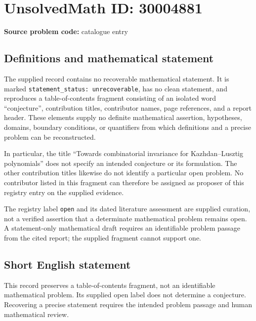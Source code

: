\documentclass[11pt]{article}
\begin{document}
\section*{UnsolvedMath ID: 30004881}
\textbf{Source problem code:} catalogue entry
\subsection{Definitions and mathematical statement}
The supplied record contains no recoverable mathematical statement. It is marked \texttt{statement\_status: unrecoverable}, has no clean statement, and reproduces a table-of-contents fragment consisting of an isolated word ``conjecture'', contribution titles, contributor names, page references, and a report header. These elements supply no definite mathematical assertion, hypotheses, domains, boundary conditions, or quantifiers from which definitions and a precise problem can be reconstructed.

In particular, the title ``Towards combinatorial invariance for Kazhdan--Lusztig polynomials'' does not specify an intended conjecture or its formulation. The other contribution titles likewise do not identify a particular open problem. No contributor listed in this fragment can therefore be assigned as proposer of this registry entry on the supplied evidence.

The registry label \texttt{open} and its dated literature assessment are supplied curation, not a verified assertion that a determinate mathematical problem remains open. A statement-only mathematical draft requires an identifiable problem passage from the cited report; the supplied fragment cannot support one.
\subsection{Short English statement}
This record preserves a table-of-contents fragment, not an identifiable mathematical problem. Its supplied open label does not determine a conjecture. Recovering a precise statement requires the intended problem passage and human mathematical review.
\end{document}
